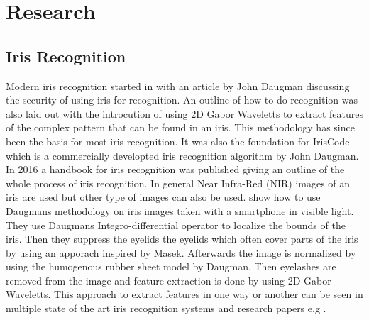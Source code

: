 \chapter{Research}
\label{cha:Research}

\section{Iris Recognition}
Modern iris recognition started in with an article by John Daugman \cite{Daugman1993} discussing the security of using iris for recognition. An outline of how to do recognition was also laid out with the introcution of using  2D Gabor Waveletts to extract features of the complex pattern that can be found in an iris. This methodology has since been the basis for most iris recognition. It was also the foundation for IrisCode which is a commercially developted iris recognition algorithm by John Daugman. In 2016 a handbook for iris recognition \cite{Bowyer2016b} was published giving an outline of the whole process of iris recognition. In general Near Infra-Red (NIR) images of an iris are used but other type of images can also be used.  \cite{Khan2017a} show how to use Daugmans methodology on iris images taken with a smartphone in visible light. They use Daugmans Integro-differential operator to localize the bounds of the iris. Then they suppress the eyelids the eyelids which often cover parts of the iris by using an apporach inspired by Masek. Afterwards the image is normalized by using the humogenous rubber sheet model by Daugman. Then eyelashes are removed from the image and feature extraction is done by using 2D Gabor Waveletts. This approach to extract features in one way or another can be seen in multiple state of the art iris recognition systems and research papers e.g \cite{Luhadiya2017a} \cite{Uka2017a} \cite{Kuehlkamp2016a}.\cite{RifaeeMustafaandAbdallahMohammadandOkosh2017a}